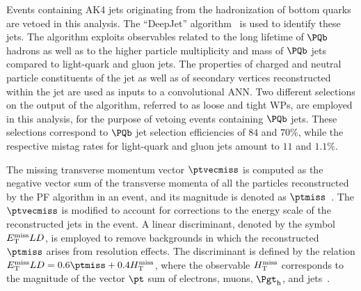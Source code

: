 Events containing AK4 jets originating from the hadronization of bottom quarks are vetoed in this analysis.
The ``DeepJet'' algorithm~\cite{CMS-DP-2017-013} is used to identify these jets.
The algorithm exploits observables related to the long lifetime of $\Pbottom$ hadrons 
as well as to the higher particle multiplicity and mass of $\Pbottom$ jets compared to light-quark and gluon jets.
The properties of charged and neutral particle constituents of the jet as well as of secondary vertices reconstructed within the jet
are used as inputs to a convolutional ANN.
Two different selections on the output of the algorithm, referred to as loose and tight WPs, are employed in this analysis, 
for the purpose of vetoing events containing $\Pbottom$ jets.
These selections correspond to $\Pbottom$ jet selection efficiencies of $84$ and $70\%$,
while the respective mistag rates for light-quark and gluon jets amount to $11$ and $1.1\%$.

The missing transverse momentum vector $\ptvecmiss$ is computed as the negative vector sum of the transverse momenta of all the particles reconstructed by the PF algorithm in an event, 
and its magnitude is denoted as $\ptmiss$~\cite{Sirunyan:2019kia}. 
The $\ptvecmiss$ is modified to account for corrections to the energy scale of the reconstructed jets in the event. 
A linear discriminant, denoted by the symbol $E_{\mathrm{T}}^\text{miss} LD$,
is employed to remove backgrounds in which the reconstructed $\ptmiss$ arises from resolution effects.
The discriminant is defined by the relation $\metLD = 0.6 \ptmiss + 0.4 \metHT$,
where the observable $H_{\mathrm{T}}^\text{miss}$ corresponds to the magnitude of the vector $\pt$ sum of electrons, muons, $\tauh$, and jets~\cite{Sirunyan:2018shy}.
